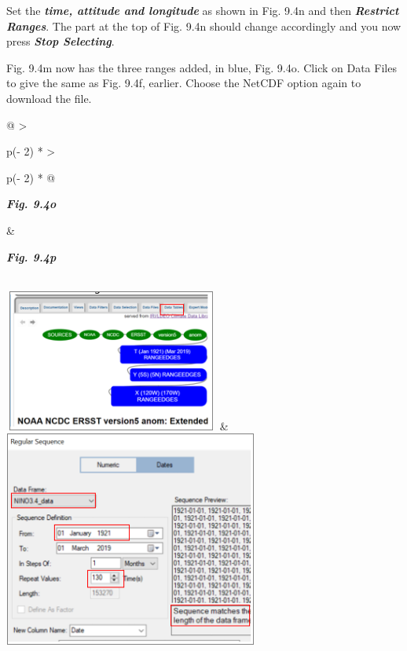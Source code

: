 \documentclass[
  letterpaper,
  DIV=11,
  numbers=noendperiod]{scrreprt}
\begin{document}
Set the \textbf{\emph{time, attitude and longitude}} as shown in Fig.
9.4n and then \textbf{\emph{Restrict Ranges}}. The part at the top of
Fig. 9.4n should change accordingly and you now press \textbf{\emph{Stop
Selecting}}.

Fig. 9.4m now has the three ranges added, in blue, Fig. 9.4o. Click on
Data Files to give the same as Fig. 9.4f, earlier. Choose the NetCDF
option again to download the file.

\begin{longtable}[]{@{}
  >{\raggedright\arraybackslash}p{(\columnwidth - 2\tabcolsep) * }
  >{\raggedright\arraybackslash}p{(\columnwidth - 2\tabcolsep) * }@{}}
\toprule\noalign{}
\begin{minipage}[b]{\linewidth}\raggedright
\textbf{\emph{Fig. 9.4o}}
\end{minipage} & \begin{minipage}[b]{\linewidth}\raggedright
\textbf{\emph{Fig. 9.4p}}
\end{minipage} \\
\midrule\noalign{}
\endhead
\bottomrule\noalign{}
\endlastfoot
\includegraphics[width=2.78099in,height=1.84508in]{figures/Fig9.4o.png}
&
\includegraphics[width=3.29054in,height=2.7998in]{figures/Fig9.4p.png} \\
\end{longtable}
\end{document}
